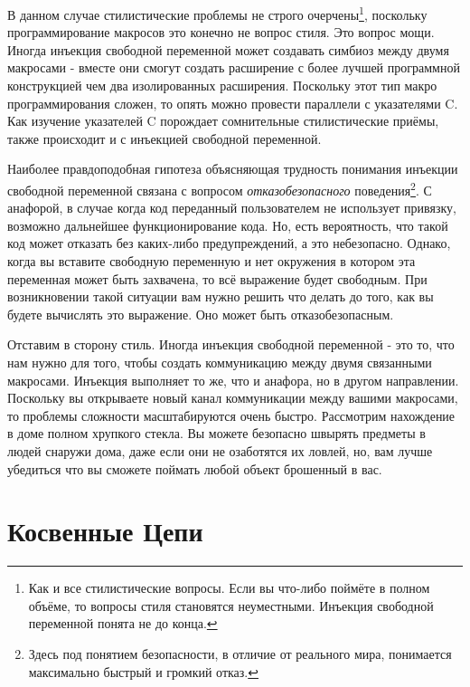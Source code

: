 В данном случае стилистические проблемы не строго очерчены\footnote{Как и все стилистические вопросы. Если вы что-либо поймёте в полном объёме, то вопросы стиля становятся неуместными. Инъекция свободной переменной понята не до конца.}, поскольку программирование макросов это конечно не вопрос стиля. Это вопрос мощи. Иногда инъекция свободной переменной может создавать симбиоз между двумя макросами - вместе они смогут создать расширение с более лучшей программной конструкцией чем два изолированных расширения. Поскольку этот тип макро программирования сложен, то опять можно провести параллели с указателями C. Как изучение указателей C порождает сомнительные стилистические приёмы, также происходит и с инъекцией свободной переменной.



Наиболее правдоподобная гипотеза объясняющая трудность понимания инъекции свободной переменной связана с вопросом \emph{отказобезопасного} поведения\footnote{Здесь под понятием безопасности, в отличие от реального мира, понимается максимально быстрый и громкий отказ.}. С анафорой, в случае когда код переданный пользователем не использует привязку, возможно дальнейшее функционирование кода. Но, есть вероятность, что такой код может отказать без каких-либо предупреждений, а это небезопасно. Однако, когда вы вставите свободную переменную и нет окружения в котором эта переменная может быть захвачена, то всё выражение будет свободным. При возникновении такой ситуации вам нужно решить что делать до того, как вы будете вычислять это выражение. Оно может быть отказобезопасным.



Отставим в сторону стиль. Иногда инъекция свободной переменной - это то, что нам нужно для того, чтобы создать коммуникацию между двумя связанными макросами. Инъекция выполняет то же, что и анафора, но в другом направлении. Поскольку вы открываете новый канал коммуникации между вашими макросами, то проблемы сложности масштабируются очень быстро. Рассмотрим нахождение в доме полном хрупкого стекла. Вы можете безопасно швырять предметы в людей снаружи дома, даже если они не озаботятся их ловлей, но, вам лучше убедиться что вы сможете поймать любой объект брошенный в вас.

\section{Косвенные Цепи}\label{section_indirection_chains}




